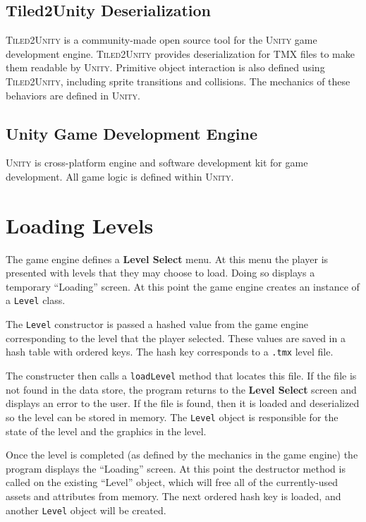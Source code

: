 \documentclass{article}
\begin{document}
\subsection{Tiled2Unity Deserialization}
\textsc{Tiled2Unity} is a community-made open source tool for the \textsc{Unity} game development engine.
\textsc{Tiled2Unity} provides deserialization for TMX files to make them readable by \textsc{Unity}. Primitive object
interaction is also defined using \textsc{Tiled2Unity}, including sprite transitions and collisions. The mechanics of
these behaviors are defined in \textsc{Unity}.

\subsection{Unity Game Development Engine}
\textsc{Unity} is cross-platform engine and software development kit for game development. All game logic is defined
within \textsc{Unity}.

\section{Loading Levels}
The game engine defines a \textbf{Level Select} menu. At this menu the player is presented with levels that they may
choose to load. Doing so displays a temporary ``Loading'' screen. At this point the game engine creates an instance of
a \texttt{Level} class.

The \texttt{Level} constructor is passed a hashed value from the game engine corresponding to the level that the
player selected. These values are saved in a hash table with ordered keys. The hash key corresponds to a
\texttt{.tmx} level file.

The constructer then calls a \texttt{loadLevel} method that locates this file. If the file is not found in the data
store, the program returns to the \textbf{Level Select} screen and displays an error to the user. If the file is
found, then it is loaded and deserialized so the level can be stored in memory. The \texttt{Level} object is
responsible for the state of the level and the graphics in the level.

Once the level is completed (as defined by the mechanics in the game engine) the program displays the ``Loading''
screen. At this point the destructor method is called on the existing ``Level'' object, which will free all of the
currently-used assets and attributes from memory. The next ordered hash key is loaded, and another \texttt{Level}
object will be created.
\end{document}
